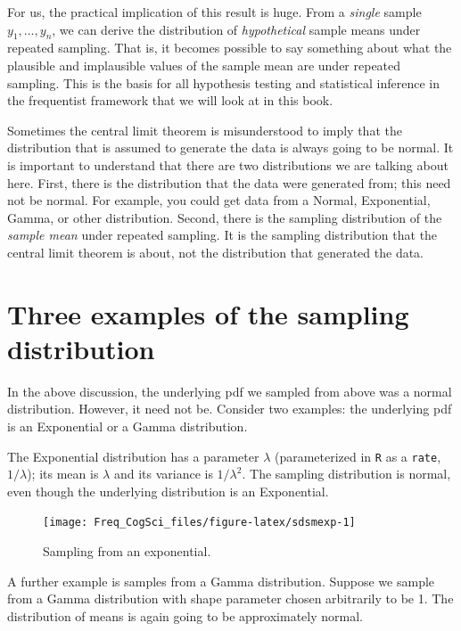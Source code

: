 \documentclass[12pt,]{krantz}
\begin{document}
For us, the practical implication of this result is huge. From a \emph{single} sample \(y_1,\dots, y_n\), we can derive the distribution of \emph{hypothetical} sample means under repeated sampling. That is, it becomes possible to say something about what the plausible and implausible values of the sample mean are under repeated sampling. This is the basis for all hypothesis testing and statistical inference in the frequentist framework that we will look at in this book.

Sometimes the central limit theorem is misunderstood to imply that the distribution that is assumed to generate the data is always going to be normal. It is important to understand that there are two distributions we are talking about here. First, there is the distribution that the data were generated from; this need not be normal. For example, you could get data from a Normal, Exponential, Gamma, or other distribution. Second, there is the sampling distribution of the \emph{sample mean} under repeated sampling. It is the sampling distribution that the central limit theorem is about, not the distribution that generated the data.

\hypertarget{three-examples-of-the-sampling-distribution}{%
\section{Three examples of the sampling distribution}\label{three-examples-of-the-sampling-distribution}}

In the above discussion, the underlying pdf we sampled from above was a normal distribution. However, it need not be. Consider two examples: the underlying pdf is an Exponential or a Gamma distribution.

The Exponential distribution has a parameter \(\lambda\) (parameterized in \texttt{R} as a \texttt{rate}, \(1/\lambda\)); its mean is \(\lambda\) and its variance is \(1/\lambda^2\). The sampling distribution is normal, even though the underlying distribution is an Exponential.

\begin{figure}
\texttt{[image: Freq\_CogSci\_files/figure-latex/sdsmexp-1]} \caption{Sampling from an exponential.}\label{fig:sdsmexp}
\end{figure}

A further example is samples from a Gamma distribution. Suppose we sample from a Gamma distribution with shape parameter chosen arbitrarily to be 1. The distribution of means is again going to be approximately normal.
\end{document}
